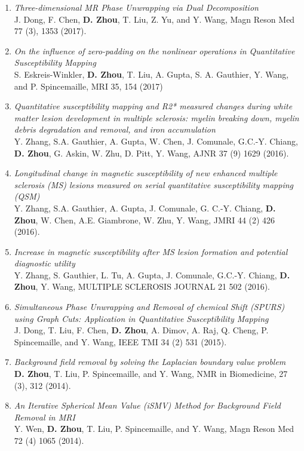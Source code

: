 \documentclass[centered,11pt,overlapped]{res}
\begin{document}
\begin{resume}
{\begin{enumerate}[leftmargin=-0.02in]
\item {\em Three-dimensional MR Phase Unwrapping via Dual Decomposition} \\
J. Dong, F. Chen,  {\bf D. Zhou}, T. Liu, Z. Yu, and Y. Wang, Magn Reson Med 77 (3), 1353 (2017).
\item {\em On the influence of zero-padding on the nonlinear operations in Quantitative Susceptibility Mapping}\\
S. Eskreis-Winkler, {\bf D. Zhou}, T. Liu, A. Gupta, S. A. Gauthier, Y. Wang, and P. Spincemaille, MRI 35, 154 (2017)
\item {\em Quantitative susceptibility mapping and R2* measured changes during white matter lesion development in multiple sclerosis: myelin breaking down, myelin debris degradation and removal, and iron accumulation }\\
Y. Zhang, S.A. Gauthier, A. Gupta, W. Chen, J. Comunale, G.C.-Y. Chiang, {\bf D. Zhou}, G. Askin, W. Zhu, D. Pitt, Y. Wang, AJNR 37 (9) 1629 (2016).
\item {\em Longitudinal change in magnetic susceptibility of new enhanced multiple sclerosis (MS) lesions measured on serial quantitative susceptibility mapping (QSM)}\\
Y. Zhang, S.A. Gauthier, A. Gupta, J. Comunale, G. C.-Y. Chiang, {\bf D. Zhou}, W. Chen, A.E. Giambrone, W. Zhu, Y. Wang, JMRI 44 (2) 426 (2016).
\item {\em Increase in magnetic susceptibility after MS lesion formation and potential diagnostic utility} \\
Y. Zhang, S. Gauthier, L. Tu, A. Gupta, J. Comunale, G.C.-Y. Chiang, {\bf D. Zhou}, Y. Wang, MULTIPLE SCLEROSIS JOURNAL 21 502 (2016).
\item {\em Simultaneous Phase Unwrapping and Removal of chemical Shift (SPURS) using Graph Cuts: Application in Quantitative Susceptibility Mapping}\\
J. Dong, T. Liu, F. Chen, {\bf D. Zhou}, A. Dimov, A. Raj, Q. Cheng, P. Spincemaille, and Y. Wang, IEEE TMI 34 (2) 531 (2015).
\item {\em Background field removal by solving the Laplacian boundary value problem}\\
{\bf D. Zhou}, T. Liu, P. Spincemaille, and Y. Wang, NMR in Biomedicine, 27 (3), 312 (2014).
\item {\em An Iterative Spherical Mean Value (iSMV) Method for Background Field Removal in MRI}\\
Y. Wen, {\bf D. Zhou}, T. Liu, P. Spincemaille, and Y. Wang, Magn Reson Med 72 (4) 1065 (2014).

\end{enumerate}}
\end{resume}
\end{document}
